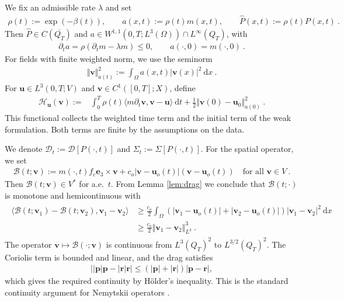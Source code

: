 \documentclass{article}
\theoremstyle{definition}
\newcommand{\bfu}{\boldsymbol{u}}
\newcommand{\bfv}{\boldsymbol{v}}
\newcommand{\bfe}{\boldsymbol{e}}
\newcommand{\D}{\mathcal{D}}
\newcommand{\dd}{\:\mathrm{d}}
\newcommand{\B}{\mathcal{B}}
\newcommand{\Hh}{\mathcal{H}}
\begin{document}
We fix an admissible rate $\lambda$ and set
\begin{align*}
    \rho(t):=\exp(-\beta(t)),\qquad
    a(x,t):=\rho(t)m(x,t),\qquad
    \hat P(x,t):=\rho(t)P(x,t) \ .
\end{align*}
Then $\hat P\in C(\overline{Q_T})$ and
$a\in W^{1,1}(0,T;L^3(\Omega))\cap L^\infty(Q_T)$, with
\begin{align}\label{eq:wu-a-monotone}
    \partial_t a=\rho(\partial_t m-\lambda m)\leq0,\qquad
    a(\cdot,0)=m(\cdot,0)\ .
\end{align}
For fields with finite weighted norm, we use the seminorm
\begin{align*}
    \Vert\bfv\Vert_{a(t)}^2:=\int_\Omega a(x,t)|\bfv(x)|^2\dd x\ .
\end{align*}
For $\bfu\in L^3(0,T;V)$ and $\bfv\in C^1([0,T];X)$, define
\begin{align}\label{eq:wu-H}
    \Hh_{\bfu}(\bfv):={}&\int_0^T\rho(t)
        \langle m\partial_t\bfv,\bfv-\bfu\rangle\dd t
        +\frac{1}{2}\Vert\bfv(0)-\bfu_0\Vert_{a(0)}^2\ .
\end{align}
This functional collects the weighted time term and the initial term of
the weak formulation. Both terms are finite by the assumptions on the data.

We denote $\D_t:=\D[P(\cdot,t)]$ and $\Sigma_t:=\Sigma[P(\cdot,t)]$.
For the spatial operator, we set
\begin{align}
    \B(t;\bfv):=m(\cdot,t)f_c\bfe_3\times\bfv
       +c_o|\bfv-\bfu_o(t)|(\bfv-\bfu_o(t))
       \quad\text{for all }\bfv\in V\ .
\end{align}
Then $\B(t;\bfv)\in V^*$ for a.e.\ $t$. From Lemma \ref{lem:drag} we conclude that $\B(t;\cdot)$ is monotone and hemicontinuous with
\begin{align}
    \begin{split}
    \langle\B(t;\bfv_1)-\B(t;\bfv_2),\bfv_1-\bfv_2\rangle
    &\geq\frac{c_o}{2}\int_\Omega
       (|\bfv_1-\bfu_o(t)|+|\bfv_2-\bfu_o(t)|)|\bfv_1-\bfv_2|^2\dd x\\
    &\geq\frac{c_o}{2}\Vert\bfv_1-\bfv_2\Vert_{L^3}^3\ .
    \end{split}\label{eq:B_motone}
\end{align}
The operator $\bfv\mapsto\B(\cdot;\bfv)$ is continuous from $L^3(Q_T)^2$ to
$L^{3/2}(Q_T)^2$. The Coriolis term is bounded and linear,
and the drag satisfies
\begin{align*}
 \big||\boldsymbol{p}|\boldsymbol{p}-|\boldsymbol{r}|\boldsymbol{r}\big|
 \leq(|\boldsymbol{p}|+|\boldsymbol{r}|)|\boldsymbol{p}-\boldsymbol{r}|,
\end{align*}
which gives the required continuity by H\"older's inequality. This is the
standard continuity argument for Nemytskii operators \cite[Section 1.3]{R13}.
\end{document}

